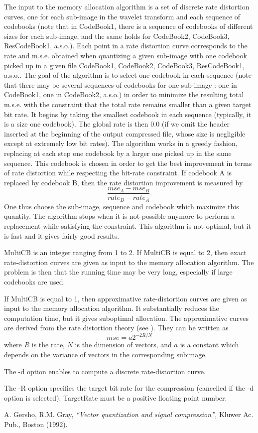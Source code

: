 The input to the memory allocation algorithm is a set of discrete rate 
distortion curves, one for each sub-image in the wavelet transform 
and each sequence of codebooks (note that in CodeBook1, there is a 
sequence of codebooks of different sizes for each sub-image, and the 
same holds for CodeBook2, CodeBook3, ResCodeBook1, a.s.o.). 
Each point in a rate distortion curve corresponds to the rate and m.s.e. 
obtained when quantizing a given sub-image with one codebook 
picked up in a given file CodeBook1, CodeBook2, CodeBook3, ResCodeBook1, 
a.s.o.. The goal of the algorithm is to select one codebook in each 
sequence (note that there may be several sequences of codebooks for 
one sub-image : one in CodeBook1, one in CodeBook2, a.s.o.) 
in order to minimize the resulting total m.s.e. with 
the constraint that the total rate remains smaller than a given 
target bit rate. It begins by taking the smallest codebook in each sequence 
(typically, it is a size one codebook). The global rate is then 0.0 
(if we omit the header inserted at the beginning of the output compressed 
file, whose size is negligible except at extremely low bit rates). 
The algorithm works in a greedy fashion, replacing at each step 
one codebook by a larger one picked up in the same sequence. 
This codebook is chosen in order to get the best improvement 
in terms of rate distortion while respecting the bit-rate constraint. 
If codebook A is replaced by codebook B, then the rate distortion improvement
is measured by 
\[
\frac{mse_A - mse_B}{rate_B - rate_A}.
\]
One thus choose the sub-image, sequence and codebook which maximize this 
quantity. The algorithm stops when it is not possible anymore to perform 
a replacement while satisfying the constraint. This algorithm is not optimal, 
but it is fast and it gives fairly good results. 

MultiCB is an integer ranging from 1 to 2. If MultiCB is equal to 2, 
then exact rate-distortion curves are given as input to the 
memory allocation algorithm. The problem is then that the running time may be 
very long, especially if large codebooks are used. 

If MultiCB is equal to 1, then approximative rate-distortion curves are given 
as input to the memory allocation algorithm. It substantially reduces 
the computation time, but it gives suboptimal allocation. 
The approximative curves are derived from the rate distortion theory 
(see \cite{kn:gg}). They can be written as 
\[
mse = a 2^{-2R/N}
\]
where $R$ is the rate, $N$ is the dimension of vectors, and $a$ is a constant 
which depends on the variance of vectors in the corresponding subimage. 

The -d option enables to compute a discrete rate-distortion curve. 

The -R option specifies the target bit rate for the compression (cancelled 
if the -d option is selected). TargetRate must be  a positive floating point 
number. 


\begin{thebibliography}{999999}

 A. Gersho, R.M. Gray, {\em ``Vector quantization 
and signal compression'', } Kluwer Ac. Pub., Boston (1992). 

\end{thebibliography}
